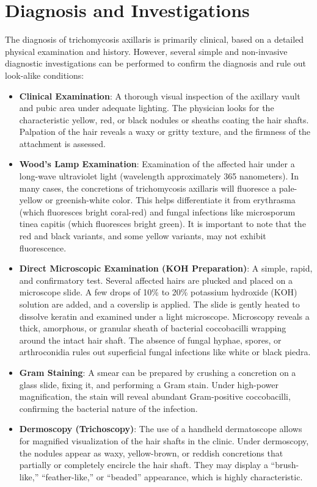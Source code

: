 \section*{Diagnosis and Investigations}
The diagnosis of trichomycosis axillaris is primarily clinical, based on a detailed physical examination and history. However, several simple and non-invasive diagnostic investigations can be performed to confirm the diagnosis and rule out look-alike conditions:
\begin{itemize}
    \item \textbf{Clinical Examination}: A thorough visual inspection of the axillary vault and pubic area under adequate lighting. The physician looks for the characteristic yellow, red, or black nodules or sheaths coating the hair shafts. Palpation of the hair reveals a waxy or gritty texture, and the firmness of the attachment is assessed.
    \item \textbf{Wood's Lamp Examination}: Examination of the affected hair under a long-wave ultraviolet light (wavelength approximately 365 nanometers). In many cases, the concretions of trichomycosis axillaris will fluoresce a pale-yellow or greenish-white color. This helps differentiate it from erythrasma (which fluoresces bright coral-red) and fungal infections like microsporum tinea capitis (which fluoresces bright green). It is important to note that the red and black variants, and some yellow variants, may not exhibit fluorescence.
    \item \textbf{Direct Microscopic Examination (KOH Preparation)}: A simple, rapid, and confirmatory test. Several affected hairs are plucked and placed on a microscope slide. A few drops of 10\% to 20\% potassium hydroxide (KOH) solution are added, and a coverslip is applied. The slide is gently heated to dissolve keratin and examined under a light microscope. Microscopy reveals a thick, amorphous, or granular sheath of bacterial coccobacilli wrapping around the intact hair shaft. The absence of fungal hyphae, spores, or arthroconidia rules out superficial fungal infections like white or black piedra.
    \item \textbf{Gram Staining}: A smear can be prepared by crushing a concretion on a glass slide, fixing it, and performing a Gram stain. Under high-power magnification, the stain will reveal abundant Gram-positive coccobacilli, confirming the bacterial nature of the infection.
    \item \textbf{Dermoscopy (Trichoscopy)}: The use of a handheld dermatoscope allows for magnified visualization of the hair shafts in the clinic. Under dermoscopy, the nodules appear as waxy, yellow-brown, or reddish concretions that partially or completely encircle the hair shaft. They may display a ``brush-like,'' ``feather-like,'' or ``beaded'' appearance, which is highly characteristic.

\end{itemize}
